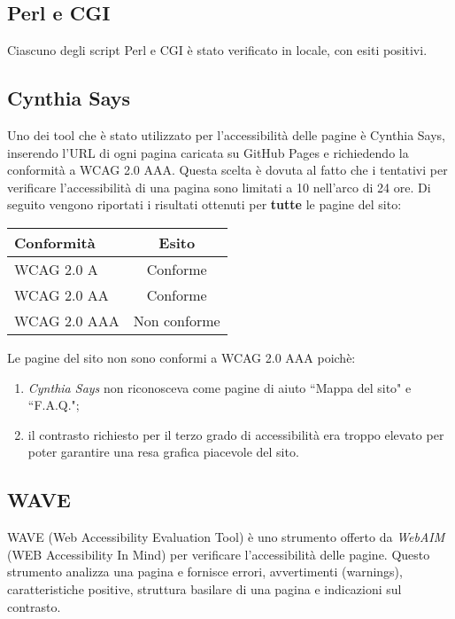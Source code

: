 \subsection{Perl e CGI}
Ciascuno degli script Perl e CGI è stato verificato in locale, con esiti
positivi.

\subsection{Cynthia Says}
Uno dei tool che è stato utilizzato per l'accessibilità delle pagine è Cynthia
Says, inserendo l'URL di ogni pagina caricata su GitHub Pages e richiedendo la
conformità a WCAG 2.0 AAA. Questa scelta è dovuta al fatto che i tentativi per
verificare l'accessibilità di una pagina sono limitati a 10 nell'arco di 24
ore.
Di seguito vengono riportati i risultati ottenuti per \textbf{tutte} le pagine
del sito:

\begin{center}
\begin{tabular}[h!]{ | l | c | }
  \hline
  Conformità & Esito \\
  \hline
  WCAG 2.0 A & Conforme \\
  \hline
  WCAG 2.0 AA & Conforme \\
  \hline
  WCAG 2.0 AAA & Non conforme \\
  \hline
\end{tabular}
\end{center}

Le pagine del sito non sono conformi a WCAG 2.0 AAA poichè:
\begin{enumerate}
\item \textit{Cynthia Says} non riconosceva come pagine di aiuto ``Mappa del
sito" e ``F.A.Q.";
\item il contrasto richiesto per il terzo grado di accessibilità era troppo
elevato per poter garantire una resa grafica piacevole del sito.
\end{enumerate}

\subsection{WAVE}
WAVE (Web Accessibility Evaluation Tool) è uno strumento offerto da
\textit{WebAIM} (WEB Accessibility In Mind) per verificare l'accessibilità
delle pagine. Questo strumento analizza una pagina e fornisce errori,
avvertimenti (warnings), caratteristiche positive, struttura basilare di una
pagina e indicazioni sul contrasto.

